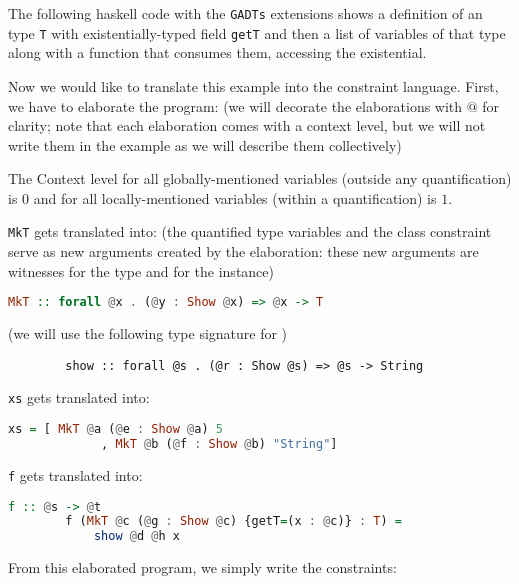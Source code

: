 \begin{ex}[Existentials]
    The following haskell code with the \lstinline{GADTs} extensions shows a definition of an type \lstinline{T} with existentially-typed field \lstinline{getT} and then a list of variables of that type along with a function that consumes them, accessing the existential.

    

    Now we would like to translate this example into the constraint language. First, we have to elaborate the program: (we will decorate the elaborations with $@$ for clarity; note that each elaboration comes with a context level, but we will not write them in the example as we will describe them collectively)

    The Context level for all globally-mentioned variables (outside any quantification) is $0$ and for all locally-mentioned variables (within a quantification) is $1$.

    \lstinline{MkT} gets translated into: (the quantified type variables and the class constraint serve as new arguments created by the elaboration: these new arguments are witnesses for the type and for the  instance)
    \begin{lstlisting}[language=Haskell]
        MkT :: forall @x . (@y : Show @x) => @x -> T
    \end{lstlisting}

    (we will use the following type signature for )
    \begin{lstlisting}
        show :: forall @s . (@r : Show @s) => @s -> String
    \end{lstlisting}

    \lstinline{xs} gets translated into:

    \begin{lstlisting}[language=Haskell]
        xs = [ MkT @a (@e : Show @a) 5
             , MkT @b (@f : Show @b) "String"]
    \end{lstlisting}

    \lstinline{f} gets translated into:

    \begin{lstlisting}[language=Haskell]
        f :: @s -> @t
        f (MkT @c (@g : Show @c) {getT=(x : @c)} : T) =
            show @d @h x
    \end{lstlisting}

    From this elaborated program, we simply write the constraints:


\end{ex}
